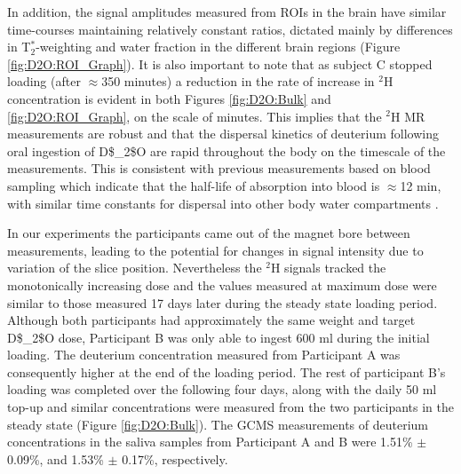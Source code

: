 In addition, the signal amplitudes measured from \ac{ROI}s in the brain have similar time-courses maintaining relatively constant ratios, dictated mainly by differences in T$_2^*$-weighting and water fraction in the different brain regions (Figure \ref{fig:D2O:ROI_Graph}). It is also important to note that as subject C stopped loading (after $\approx$350 minutes) a reduction in the rate of increase in $^2$H concentration is evident in both Figures \ref{fig:D2O:Bulk} and \ref{fig:D2O:ROI_Graph}, on the scale of minutes. This implies that the $^2$H MR measurements are robust and that the dispersal kinetics of deuterium following oral ingestion of \ac{D$_2$O} are rapid throughout the body on the timescale of the measurements. This is consistent with previous measurements based on blood sampling which indicate that the half-life of absorption into blood is $\approx$12 min, with similar time constants for dispersal into other body water compartments \cite{Davies2001RapidWater,Peronnet2012PharmacokineticHumans}. 

In our experiments the participants came out of the magnet bore between measurements, leading to the potential for changes in signal intensity due to variation of the slice position. Nevertheless the $^2$H signals tracked the monotonically increasing dose and the values measured at maximum dose were similar to those measured 17 days later during the steady state loading period. Although both participants had approximately the same weight and target \ac{D$_2$O} dose, Participant B was only able to ingest 600 ml during the initial loading. The deuterium concentration measured from Participant A was consequently higher at the end of the loading period. The rest of participant B’s loading was completed over the following four days, along with the daily 50 ml top-up and similar concentrations were measured from the two participants in the steady state (Figure \ref{fig:D2O:Bulk}). The GCMS measurements of deuterium concentrations in the saliva samples from Participant A and B were 1.51\% $\pm$ 0.09\%, and 1.53\% $\pm$ 0.17\%, respectively. 

